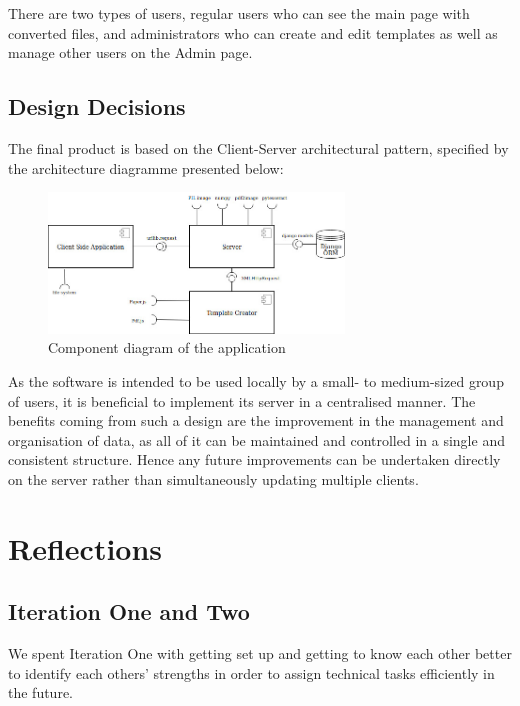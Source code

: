 \documentclass{l3proj}
\begin{document}
There are two types of users, regular users who can see the main page with converted files, and administrators who can create and edit templates as well as manage other users on the Admin page.




\subsection{Design Decisions}

The final product is based on the Client-Server architectural pattern, specified by the architecture diagramme presented below:

\begin{figure}[h]
\includegraphics[width=0.7\textwidth]{figures/ComponentDiagram.png}
\centering
\caption{Component diagram of the application}
\label{fig:componentDiagram}
\end{figure}

As the software is intended to be used locally by a small- to medium-sized group of users, it is beneficial to implement its server in a centralised manner. The benefits coming from such a design are the improvement in the management and organisation of data, as all of it can be maintained and controlled in a single and consistent structure. Hence any future improvements can be undertaken directly on the server rather than simultaneously updating multiple clients.


\section{Reflections}
\subsection{Iteration One and Two}

We spent Iteration One with getting set up and getting to know each other better to identify each others’ strengths  in order to assign technical tasks efficiently in the future.
\end{document}
